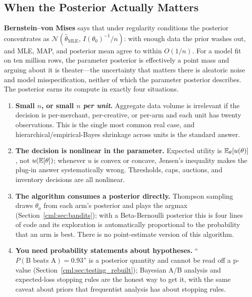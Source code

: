 \subsection{When the Posterior Actually Matters}

\begin{keyinsight}
\textbf{Bernstein--von Mises} says that under regularity conditions the posterior concentrates as $\mathcal{N}(\hat\theta_{\text{MLE}},\, I(\theta_0)^{-1}/n)$: with enough data the prior washes out, and MLE, MAP, and posterior mean agree to within $O(1/n)$. For a model fit on ten million rows, the parameter posterior is effectively a point mass and arguing about it is theater---the uncertainty that matters there is aleatoric noise and model misspecification, neither of which the parameter posterior describes. The posterior earns its compute in exactly four situations.
\end{keyinsight}

\begin{enumerate}
    \item \textbf{Small $n$, or small $n$ \textit{per unit}.} Aggregate data volume is irrelevant if the decision is per-merchant, per-creative, or per-arm and each unit has twenty observations. This is the single most common real case, and hierarchical/empirical-Bayes shrinkage across units is the standard answer.
    \item \textbf{The decision is nonlinear in the parameter.} Expected utility is $\operatorname{\mathbb{E}}_\theta[u(\theta)]$, not $u(\operatorname{\mathbb{E}}[\theta])$; whenever $u$ is convex or concave, Jensen's inequality makes the plug-in answer systematically wrong. Thresholds, caps, auctions, and inventory decisions are all nonlinear.
    \item \textbf{The algorithm consumes a posterior directly.} Thompson sampling draws $\theta_a$ from each arm's posterior and plays the argmax (Section~\ref{cml:sec:bandits}); with a Beta-Bernoulli posterior this is four lines of code and its exploration is automatically proportional to the probability that an arm is best. There is no point-estimate version of this algorithm.
    \item \textbf{You need probability statements about hypotheses.} ``$P(\text{B beats A}) = 0.93$'' is a posterior quantity and cannot be read off a p-value (Section~\ref{cml:sec:testing_rebuilt}); Bayesian A/B analysis and expected-loss stopping rules are the honest way to get it, with the same caveat about priors that frequentist analysis has about stopping rules.
\end{enumerate}

